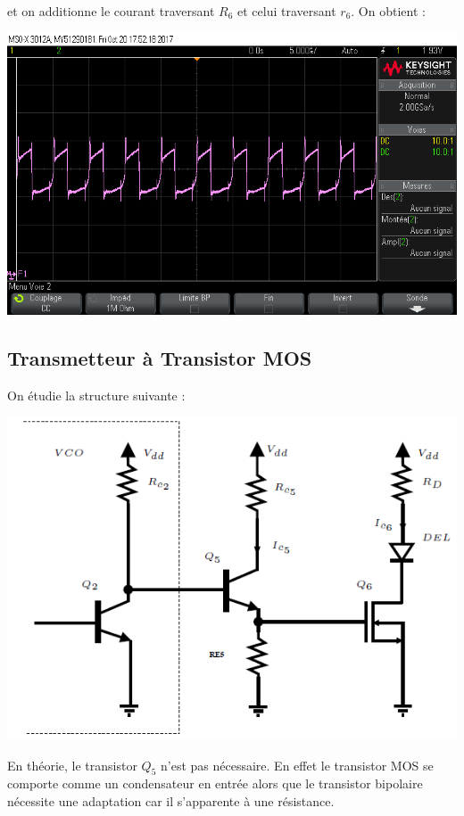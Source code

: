 \documentclass[a4paper]{report}
\begin{document}
et on additionne le courant traversant $R_6$ et celui traversant $r_6$. On obtient :

\begin{center}
\includegraphics[width=1\textwidth]{Courant_diode_opt.png}
\end{center}



\subsection{Transmetteur à Transistor MOS}
On étudie la structure suivante : \\
\begin{center}
\includegraphics[width=.5\textwidth]{transimos.PNG}
\end{center}

En théorie, le transistor $Q_5$ n'est pas nécessaire. En effet le transistor MOS se comporte comme un condensateur en entrée alors que le transistor bipolaire nécessite une adaptation car il s'apparente à une résistance.\\
\end{document}
